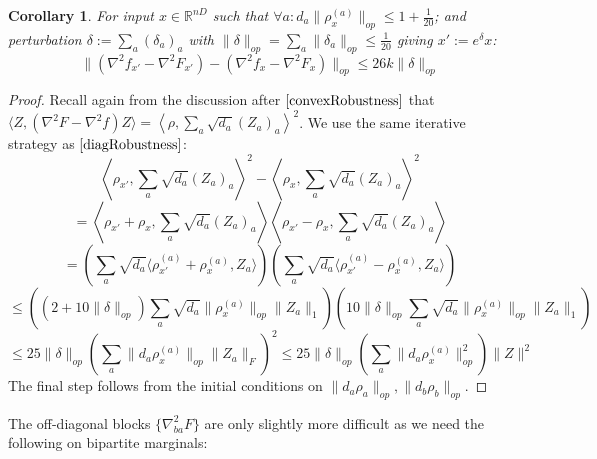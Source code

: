 \documentclass{article}
\newtheorem{corollary}[theorem]{Corollary}
\newcommand{\R}{{\mathbb{R}}}
\newcommand\samp{x}
\newcommand{\CF}[1]{{\color{purple}[CF: #1]}}
\newcommand{\AR}[1]{{\color{orange}[AR: #1]}}
\begin{document}
\begin{corollary} \label{rankoneRobustness}
For input $x \in \R^{nD}$ such that $\forall a: d_{a} \|\rho_{\samp}^{(a)}\|_{op} \leq 1 + \frac{1}{20}$; and perturbation $\delta := \sum_{a} (\delta_{a})_{a}$ with $\|\delta\|_{op} = \sum_{a} \|\delta_{a}\|_{op} \leq \frac{1}{20}$ giving $\samp' := e^{\delta} \samp$:
\[ \|(\nabla^{2} f_{\samp'} - \nabla^{2} F_{\samp'}) - (\nabla^{2} f_{\samp} - \nabla^{2} F_{\samp})\|_{op} \leq 26 k \|\delta\|_{op}     \]
\end{corollary}
\begin{proof}
Recall again from the discussion after $\ref{convexRobustness}$ that $\langle Z, (\nabla^{2} F - \nabla^{2} f) Z \rangle = \left\langle \rho, \sum_{a} \sqrt{d_{a}} (Z_{a})_{a}  \right\rangle^{2}$. We use the same iterative strategy as $\ref{diagRobustness}$:
\[    \left\langle \rho_{\samp'}, \sum_{a} \sqrt{d_{a}} (Z_{a})_{a}  \right\rangle^{2} -  \left\langle \rho_{\samp}, \sum_{a} \sqrt{d_{a}} (Z_{a})_{a}  \right\rangle^{2}    \]
\[ = \left\langle \rho_{\samp'} + \rho_{\samp}, \sum_{a} \sqrt{d_{a}} (Z_{a})_{a}  \right\rangle \left\langle \rho_{\samp'} - \rho_{\samp}, \sum_{a} \sqrt{d_{a}} (Z_{a})_{a}  \right\rangle  \]
\[ = \left( \sum_{a} \sqrt{d_{a}} \langle \rho_{\samp'}^{(a)} + \rho_{\samp}^{(a)}, Z_{a} \rangle \right) \left( \sum_{a} \sqrt{d_{a}} \langle \rho_{\samp'}^{(a)} - \rho_{\samp}^{(a)}, Z_{a} \rangle \right)     \]
\[ \leq \left( (2+10\|\delta\|_{op})\sum_{a} \sqrt{d_{a}} \|\rho_{\samp}^{(a)}\|_{op} \|Z_{a}\|_{1}   \right) 
\left( 10\|\delta\|_{op} \sum_{a} \sqrt{d_{a}} \| \rho_{\samp}^{(a)}\|_{op} \|Z_{a}\|_{1}   \right)    \]
\[ \leq 25 \|\delta\|_{op} \left( \sum_{a} \|d_{a} \rho_{\samp}^{(a)}\|_{op} \|Z_{a}\|_{F} \right)^{2} \leq 25 \|\delta\|_{op} \left( \sum_{a} \|d_{a} \rho_{\samp}^{(a)}\|_{op}^{2} \right) \|Z\|^{2}      \]
The final step follows from the initial conditions on $\|d_{a} \rho_{a}\|_{op}, \|d_{b} \rho_{b}\|_{op}$. 
\end{proof}

The off-diagonal blocks $\{\nabla^{2}_{ba} F\}$ are only slightly more difficult as we need the following on bipartite marginals:
\end{document}
